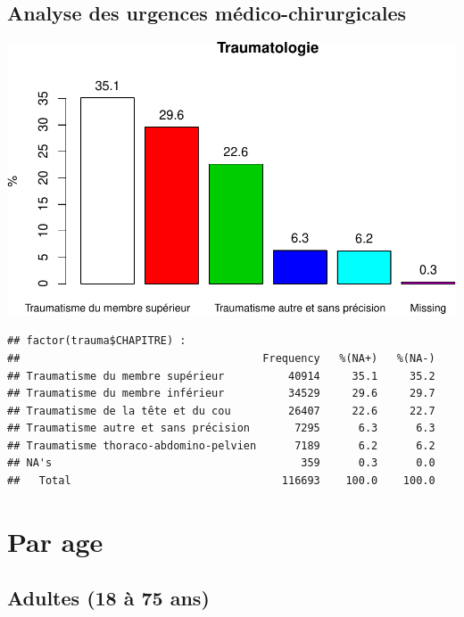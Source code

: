\documentclass[]{article}
\newenvironment{Shaded}{\begin{snugshade}}{\end{snugshade}}
\newcommand{\KeywordTok}[1]{\textcolor[rgb]{0.13,0.29,0.53}{\textbf{{#1}}}}
\newcommand{\DecValTok}[1]{\textcolor[rgb]{0.00,0.00,0.81}{{#1}}}
\newcommand{\StringTok}[1]{\textcolor[rgb]{0.31,0.60,0.02}{{#1}}}
\newcommand{\CommentTok}[1]{\textcolor[rgb]{0.56,0.35,0.01}{\textit{{#1}}}}
\newcommand{\NormalTok}[1]{{#1}}
\begin{document}
\subsection{Analyse des urgences
médico-chirurgicales}\label{analyse-des-urgences-medico-chirurgicales-1}

\includegraphics{analyse_merge_files/figure-latex/urg_traumato-1.pdf}\\

\begin{verbatim}
## factor(trauma$CHAPITRE) : 
##                                      Frequency   %(NA+)   %(NA-)
## Traumatisme du membre supérieur          40914     35.1     35.2
## Traumatisme du membre inférieur          34529     29.6     29.7
## Traumatisme de la tête et du cou         26407     22.6     22.7
## Traumatisme autre et sans précision       7295      6.3      6.3
## Traumatisme thoraco-abdomino-pelvien      7189      6.2      6.2
## NA's                                       359      0.3      0.0
##   Total                                 116693    100.0    100.0
\end{verbatim}

\section{Par age}\label{par-age}

\subsection{Adultes (18 à 75 ans)}\label{adultes-18-a-75-ans}

\begin{Shaded}
\end{Shaded}
\end{document}
